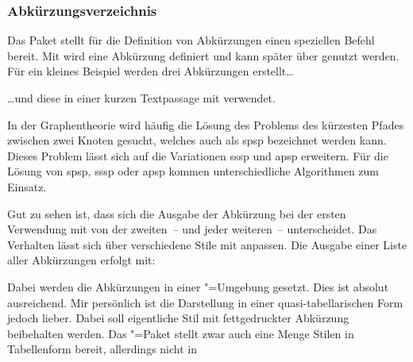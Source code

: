 \documentclass[english,ngerman]{tudscrartcl}
\begin{document}
\subsubsection{Abkürzungsverzeichnis}
Das Paket  stellt für die Definition von Abkürzungen einen 
speziellen Befehl bereit. Mit\LParameter{}%
 wird eine Abkürzung definiert und 
kann später über  genutzt werden. Für ein kleines Beispiel 
werden drei Abkürzungen erstellt\dots
%
\begin{Tutorial}
\end{Tutorial}
\vspace*{-1.5\baselineskip}\par\noindent%
%
\dots und diese in einer kurzen Textpassage mit  
verwendet.
%
\begin{Tutorial}
In der Graphentheorie wird häufig die Lösung des Problems des kürzesten
Pfades zwischen zwei Knoten gesucht, welches auch als \gls{spsp}
bezeichnet werden kann. Dieses Problem lässt sich auf die Variationen
\gls{sssp} und \gls{apsp} erweitern. Für die Lösung von \gls{spsp},
\gls{sssp} oder \gls{apsp} kommen unterschiedliche Algorithmen zum Einsatz.
\end{Tutorial}
%
Gut zu sehen ist, dass sich die Ausgabe der Abkürzung bei der ersten Verwendung 
mit  von der zweiten~-- und jeder weiteren~-- unterscheidet. Das 
Verhalten lässt sich über verschiedene Stile mit  
anpassen. Die Ausgabe einer Liste aller Abkürzungen erfolgt mit:
%
\begin{Tutorial*}
\printacronyms
\end{Tutorial*}
\vspace*{-1.5\baselineskip}\par\noindent%
\begin{quoting}[rightmargin=0pt]
\printacronyms
\end{quoting}
%
Dabei werden die Abkürzungen in einer "=Umgebung 
gesetzt. Dies ist absolut ausreichend. Mir persönlich ist die Darstellung in 
einer quasi-tabellarischen Form jedoch lieber. Dabei soll eigentliche Stil mit 
fettgedruckter Abkürzung beibehalten werden. Das "=Paket 
stellt zwar auch eine Menge Stilen in Tabellenform bereit, allerdings nicht in 
\end{document}
